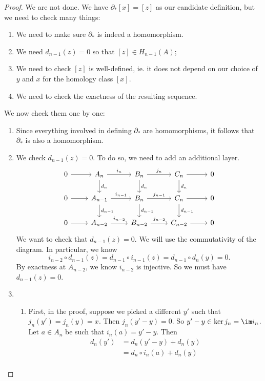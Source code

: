 \documentclass[a4paper]{article}
\begin{document}
\begin{proof}
  We are not done. We have $\partial_* [x] = [z]$ as our candidate definition, but we need to check many things:
  \begin{enumerate}
    \item We need to make sure $\partial_*$ is indeed a homomorphism.
    \item We need $d_{n - 1}(z) = 0$ so that $[z] \in H_{n - 1}(A)$;
    \item We need to check $[z]$ is well-defined, ie. it does not depend on our choice of $y$ and $x$ for the homology class $[x]$.
    \item We need to check the exactness of the resulting sequence.
  \end{enumerate}
  We now check them one by one:
  \begin{enumerate}
    \item Since everything involved in defining $\partial_*$ are homomorphisms, it follows that $\partial_*$ is also a homomorphism.
    \item We check $d_{n - 1}(z) = 0$. To do so, we need to add an additional layer.
      \[
        \begin{tikzcd}
          0 \ar[r] & A_n \ar[r, "i_n"] \ar[d, "d_n"] & B_n \ar[r, "j_n"] \ar[d, "d_n"] & C_n \ar[r] \ar[d, "d_n"] & 0\\
          0 \ar[r] & A_{n - 1} \ar[r, "i_{n - 1}"] \ar[d, "d_{n - 1}"] & B_n \ar[r, "j_{n - 1}"] \ar[d, "d_{n - 1}"] & C_n \ar[r] \ar[d, "d_{n - 1}"] & 0\\
          0 \ar[r] & A_{n - 2} \ar[r, "i_{n - 2}"] & B_{n - 2} \ar[r, "j_{n - 2}"] & C_{n - 2} \ar[r] & 0
        \end{tikzcd}
      \]
      We want to check that $d_{n - 1}(z) = 0$. We will use the commutativity of the diagram. In particular, we know
      \[
        i_{n - 2} \circ d_{n - 1}(z) = d_{n - 1} \circ i_{n - 1} (z) = d_{n - 1} \circ d_n(y) = 0.
      \]
      By exactness at $A_{n - 2}$, we know $i_{n - 2}$ is injective. So we must have $d_{n - 1}(z) = 0$.
    \item
      \begin{enumerate}
        \item First, in the proof, suppose we picked a different $y'$ such that $j_n(y') = j_n(y) = x$. Then $j_n(y' - y) = 0$. So $y' - y \in \ker j_n = \im i_n$. Let $a \in A_n$ be such that $i_n(a) = y' - y$. Then
          \begin{align*}
            d_n(y') &= d_n(y' - y) + d_n(y) \\
            &= d_n \circ i_n (a) + d_n(y) \\

\end{align*}
\end{enumerate}
\end{enumerate}
\end{proof}
\end{document}
